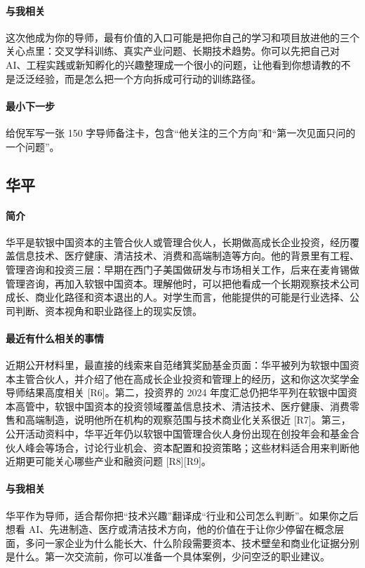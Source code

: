 \documentclass[UTF8,zihao=-4]{ctexart}
\begin{document}
\paragraph{与我相关} 这次他成为你的导师，最有价值的入口可能是把你自己的学习和项目放进他的三个关心点里：交叉学科训练、真实产业问题、长期技术趋势。你可以先把自己对 AI、工程实践或新知孵化的兴趣整理成一个很小的问题，让他看到你想请教的不是泛泛经验，而是怎么把一个方向拆成可行动的训练路径。
\paragraph{最小下一步} 给倪军写一张 150 字导师备注卡，包含“他关注的三个方向”和“第一次见面只问的一个问题”。
\subsection*{华平}
\paragraph{简介} 华平是软银中国资本的主管合伙人或管理合伙人，长期做高成长企业投资，经历覆盖信息技术、医疗健康、清洁技术、消费和高端制造等方向。他的背景里有工程、管理咨询和投资三层：早期在西门子美国做研发与市场相关工作，后来在麦肯锡做管理咨询，再加入软银中国资本。理解他时，可以把他看成一个长期观察技术公司成长、商业化路径和资本退出的人。对学生而言，他能提供的可能是行业选择、公司判断、资本视角和职业路径上的现实反馈。
\paragraph{最近有什么相关的事情} 近期公开材料里，最直接的线索来自范绪箕奖励基金页面：华平被列为软银中国资本主管合伙人，并介绍了他在高成长企业投资和管理上的经历，这和你这次奖学金导师结果高度相关 [R6]。第二，投资界的 2024 年度汇总仍把华平列在软银中国资本高管中，软银中国资本的投资领域覆盖信息技术、清洁技术、医疗健康、消费零售和高端制造，说明他所在机构的观察范围与技术商业化关系很近 [R7]。第三，公开活动资料中，华平近年仍以软银中国管理合伙人身份出现在创投年会和基金合伙人峰会等场合，讨论行业机会、资本配置和投资策略；这些材料适合用来判断他近期更可能关心哪些产业和融资问题 [R8][R9]。
\paragraph{与我相关} 华平作为导师，适合帮你把“技术兴趣”翻译成“行业和公司怎么判断”。如果你之后想看 AI、先进制造、医疗或清洁技术方向，他的价值在于让你少停留在概念层面，多问一家企业为什么能长大、什么阶段需要资本、技术壁垒和商业化证据分别是什么。第一次交流前，你可以准备一个具体案例，少问空泛的职业建议。
\end{document}
